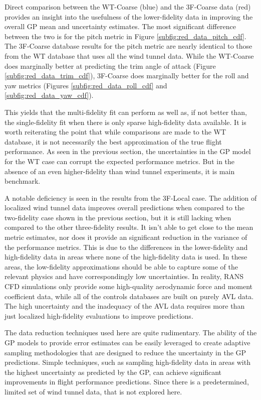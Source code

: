 Direct comparison between the WT-Coarse (blue) and the 3F-Coarse data (red) provides an insight into the usefulness of the lower-fidelity data in improving the overall GP mean and uncertainty estimates. 
The most significant difference between the two is for the pitch metric in Figure \ref{subfig:red_data_pitch_cdf}.
The 3F-Coarse database results for the pitch metric are nearly identical to those from the WT database that uses all the wind tunnel data. 
While the WT-Coarse does marginally better at predicting the trim angle of attack (Figure \ref{subfig:red_data_trim_cdf}), 3F-Coarse does marginally better for the roll and yaw metrics (Figures \ref{subfig:red_data_roll_cdf} and \ref{subfig:red_data_yaw_cdf}).

This yields that the multi-fidelity fit can perform as well as, if not better than, the single-fidelity fit when there is only sparse high-fidelity data available. 
It is worth reiterating the point that while comparisons are made to the WT database, it is not necessarily the best approximation of the true flight performance.
As seen in the previous section, the uncertainties in the GP model for the WT case can corrupt the expected performance metrics. 
But in the absence of an even higher-fidelity than wind tunnel experiments, it is main benchmark. 

A notable deficiency is seen in the results from the 3F-Local case. 
The addition of localized wind tunnel data improves overall predictions when compared to the two-fidelity case shown in the previous section, but it is still lacking when compared to the other three-fidelity results. 
It isn't able to get close to the mean metric estimates, nor does it provide an significant reduction in the variance of the performance metrics. 
This is due to the differences in the lower-fidelity and high-fidelity data in areas where none of the high-fidelity data is used. 
In these areas, the low-fidelity approximations should be able to capture some of the relevant physics and have correspondingly low uncertainties. 
In reality, RANS CFD simulations only provide some high-quality aerodynamic force and moment coefficient data, while all of the controls databases are built on purely AVL data. 
The high uncertainty and the inadequacy of the AVL data requires more than just localized high-fidelity evaluations to improve predictions. 

The data reduction techniques used here are quite rudimentary. 
The ability of the GP models to provide error estimates can be easily leveraged to create adaptive sampling methodologies that are designed to reduce the uncertainty in the GP predictions.
Simple techniques, such as sampling high-fidelity data in areas with the highest uncertainty as predicted by the GP, can achieve significant improvements in flight performance predictions. 
Since there is a predetermined, limited set of wind tunnel data, that is not explored here.
